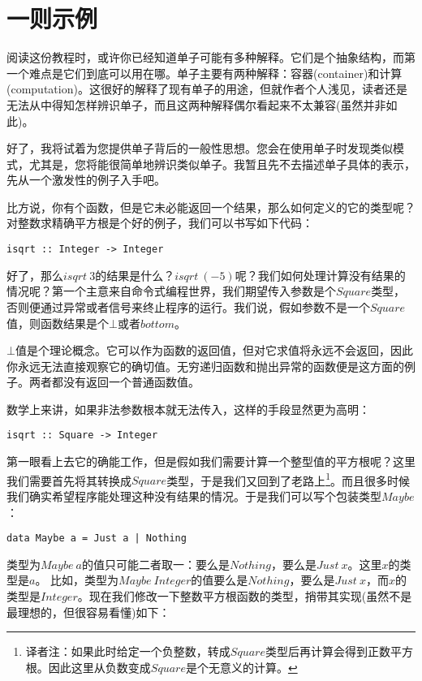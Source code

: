 \section{一则示例}

阅读这份教程时，或许你已经知道单子可能有多种解释。它们是个抽象结构，而第一个难点是它们到底可以用在哪。单子主要有两种解释：容器(container)和计算(computation)。这很好的解释了现有单子的用途，但就作者个人浅见，读者还是无法从中得知怎样辨识单子，而且这两种解释偶尔看起来不太兼容(虽然并非如此)。

好了，我将试着为您提供单子背后的一般性思想。您会在使用单子时发现类似模式，尤其是，您将能很简单地辨识类似单子。我暂且先不去描述单子具体的表示，先从一个激发性的例子入手吧。

比方说，你有个函数，但是它未必能返回一个结果，那么如何定义的它的类型呢？对整数求精确平方根是个好的例子，我们可以书写如下代码：

\begin{lstlisting}
isqrt :: Integer -> Integer
\end{lstlisting}

好了，那么$isqrt\ 3$的结果是什么？$isqrt\ (-5)$呢？我们如何处理计算没有结果的情况呢？第一个主意来自命令式编程世界，我们期望传入参数是个$Square$类型，否则便通过异常或者信号来终止程序的运行。我们说，假如参数不是一个$Square$值，则函数结果是个$\bot$或者$bottom$。

$\bot$值是个理论概念。它可以作为函数的返回值，但对它求值将永远不会返回，因此你永远无法直接观察它的确切值。无穷递归函数和抛出异常的函数便是这方面的例子。两者都没有返回一个普通函数值。

数学上来讲，如果非法参数根本就无法传入，这样的手段显然更为高明：

\begin{lstlisting}
isqrt :: Square -> Integer
\end{lstlisting}

第一眼看上去它的确能工作，但是假如我们需要计算一个整型值的平方根呢？这里我们需要首先将其转换成$Square$类型，于是我们又回到了老路上\footnote{译者注：如果此时给定一个负整数，转成$Square$类型后再计算会得到正数平方根。因此这里从负数变成$Square$是个无意义的计算。}。而且很多时候我们确实希望程序能处理这种没有结果的情况。于是我们可以写个包装类型$Maybe$：

\begin{lstlisting}
data Maybe a = Just a | Nothing
\end{lstlisting}

类型为$Maybe\ a$的值只可能二者取一：要么是$Nothing$，要么是$Just\ x$。这里$x$的类型是$a$。 比如，类型为$Maybe\ Integer$的值要么是$Nothing$，要么是$Just\ x$，而$x$的类型是$Integer$。现在我们修改一下整数平方根函数的类型，捎带其实现(虽然不是最理想的，但很容易看懂)如下：

